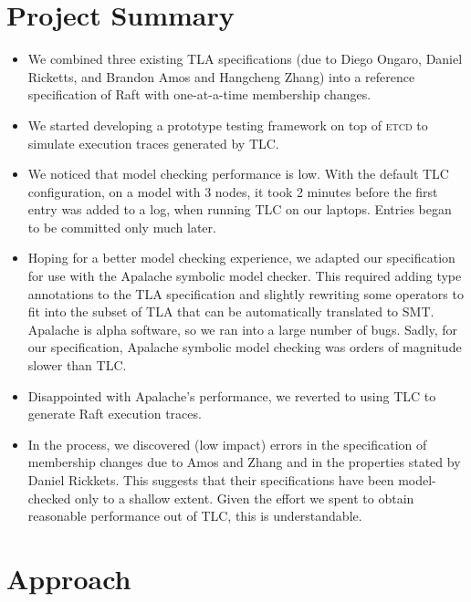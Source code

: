 \documentclass[a4paper]{article}
\newcommand{\tname}[1]{\textsc{#1}\xspace}
\newcommand{\etcd}{\tname{etcd}}
\begin{document}
\section{Project Summary}

\begin{itemize}
    \item We combined three existing TLA specifications (due to Diego Ongaro, Daniel Ricketts, and Brandon Amos and Hangcheng Zhang) into a reference specification of Raft with one-at-a-time membership changes.

    \item We started developing a prototype testing framework on top of \etcd to simulate execution traces generated by TLC.

    \item We noticed that model checking performance is low.
    With the default TLC configuration, on a model with 3 nodes, it took 2 minutes before the first entry was added to a log, when running TLC on our laptops.
    Entries began to be committed only much later.

    \item Hoping for a better model checking experience, we adapted our specification for use with the Apalache symbolic model checker.
    This required adding type annotations to the TLA specification and slightly rewriting some operators to fit into the subset of TLA that can be automatically translated to SMT.
    Apalache is alpha software, so we ran into a large number of bugs.
    Sadly, for our specification, Apalache symbolic model checking was orders of magnitude slower than TLC.

    \item Disappointed with Apalache's performance, we reverted to using TLC to generate Raft execution traces.

    \item In the process, we discovered (low impact) errors in the
    specification of membership changes due to Amos and Zhang and in the
    properties stated by Daniel Rickkets.
    This suggests that their specifications have been model-checked only to a shallow extent.
    Given the effort we spent to obtain reasonable performance out of TLC, this is understandable.

\end{itemize}


\section{Approach}
\end{document}
